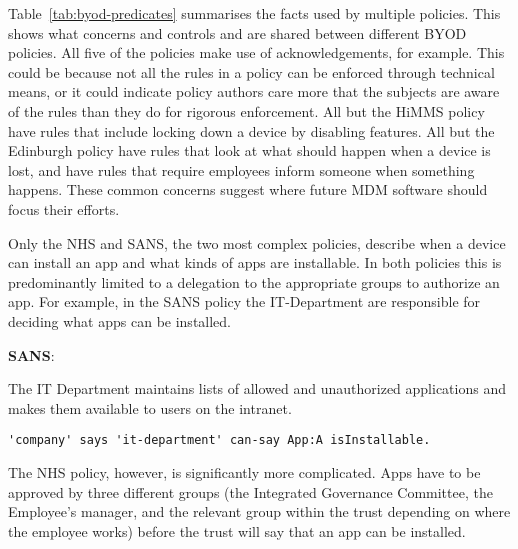 \documentclass{llncs}
\newenvironment{policyrule}[1]{%
  \begin{mdframed}\footnotesize
      \noindent\textbf{\sffamily #1}:~\itshape%
}{%
  \end{mdframed}
}
\begin{document}
Table~\ref{tab:byod-predicates} summarises the facts used by multiple policies.
This shows what concerns and controls and are shared between different BYOD policies.
All five of the policies make use of acknowledgements, for example.
This could be because not all the rules in a policy can be enforced through technical means, 
  or it could indicate policy authors care more that the subjects are aware of the rules than they do for rigorous enforcement.
All but the HiMMS policy have rules that include locking down a device by disabling features.
All but the Edinburgh policy have rules that look at what should happen when a device is lost,
  and have rules that require employees inform someone when something happens.
These common concerns suggest where future \ac{MDM} software should focus their efforts.

Only the NHS and SANS, the two most complex policies, describe when a device can install an app and what kinds of apps are installable.
In both policies this is predominantly limited to a delegation to the appropriate groups to authorize an app.
For example, in the SANS policy the IT-Department are responsible for deciding what apps can be installed.
\begin{policyrule}{SANS}
  The IT Department maintains lists of allowed and unauthorized applications and makes them available to users on the intranet.
  \normalfont
  \begin{lstlisting}
'company' says 'it-department' can-say App:A isInstallable.
  \end{lstlisting}
\end{policyrule}
The NHS policy, however, is significantly more complicated.
Apps have to be approved by three different groups (the Integrated Governance Committee, the Employee's manager, and the relevant group within the trust depending on where the employee works) before the trust will say that an app can be installed.
\end{document}
